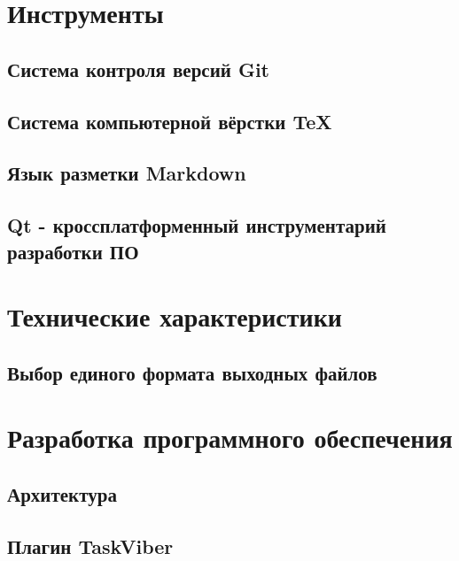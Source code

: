 \section{Инструменты}
\setcounter{figure}{0}
\subsection{Система контроля версий Git}

\subsection{Система компьютерной вёрстки \TeX}

\subsection{Язык разметки Markdown}
\label{sec:markdown}
\subsection{Qt - кроссплатформенный инструментарий разработки ПО}


\section{Технические характеристики}

\subsection{Выбор единого формата выходных файлов}


\clearpage
\section{Разработка программного обеспечения}
\setcounter{figure}{0}
 
\subsection{Архитектура}


\newpage
\subsection{Плагин TaskViber}


\newpage
